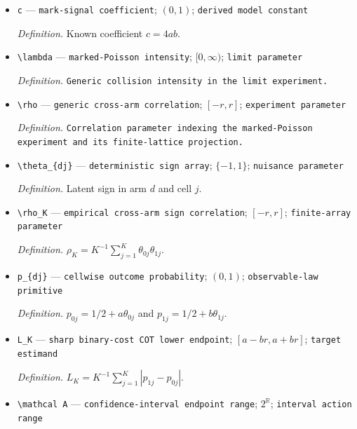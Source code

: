 \documentclass{article}
\begin{document}
\begin{itemize}
  \par\smallskip\noindent\emph{Definition.} \texttt{Nominal interval miscoverage probability.}
  \item \texttt{c} --- \texttt{mark-\allowbreak{}signal coefficient}; \((0,1)\); \texttt{derived model constant}
  \par\smallskip\noindent\emph{Definition.} Known coefficient \(c=4ab\).
  \item \texttt{\textbackslash{}\allowbreak{}lambda} --- \texttt{marked-\allowbreak{}Poisson intensity}; \([0,\infty)\); \texttt{limit parameter}
  \par\smallskip\noindent\emph{Definition.} \texttt{Generic collision intensity in the limit experiment.}
  \item \texttt{\textbackslash{}\allowbreak{}rho} --- \texttt{generic cross-\allowbreak{}arm correlation}; \([-r,r]\); \texttt{experiment parameter}
  \par\smallskip\noindent\emph{Definition.} \texttt{Correlation parameter indexing the marked-\allowbreak{}Poisson experiment and its finite-\allowbreak{}lattice projection.}
  \item \texttt{\textbackslash{}\allowbreak{}theta\_\allowbreak{}\{dj\}\allowbreak{}} --- \texttt{deterministic sign array}; \(\{-1,1\}\); \texttt{nuisance parameter}
  \par\smallskip\noindent\emph{Definition.} Latent sign in arm \(d\) and cell \(j\).
  \item \texttt{\textbackslash{}\allowbreak{}rho\_\allowbreak{}K} --- \texttt{empirical cross-\allowbreak{}arm sign correlation}; \([-r,r]\); \texttt{finite-\allowbreak{}array parameter}
  \par\smallskip\noindent\emph{Definition.} \(\rho_K=K^{-1}\sum_{j=1}^{K}\theta_{0j}\theta_{1j}\).
  \item \texttt{p\_\allowbreak{}\{dj\}\allowbreak{}} --- \texttt{cellwise outcome probability}; \((0,1)\); \texttt{observable-\allowbreak{}law primitive}
  \par\smallskip\noindent\emph{Definition.} \(p_{0j}=1/2+a\theta_{0j}\) and \(p_{1j}=1/2+b\theta_{1j}\).
  \item \texttt{L\_\allowbreak{}K} --- \texttt{sharp binary-\allowbreak{}cost COT lower endpoint}; \([a-br,a+br]\); \texttt{target estimand}
  \par\smallskip\noindent\emph{Definition.} \(L_K=K^{-1}\sum_{j=1}^{K}|p_{1j}-p_{0j}|\).
  \item \texttt{\textbackslash{}\allowbreak{}mathcal A} --- \texttt{confidence-\allowbreak{}interval endpoint range}; \(2^{\mathbb R}\); \texttt{interval action range}

\end{itemize}
\end{document}

